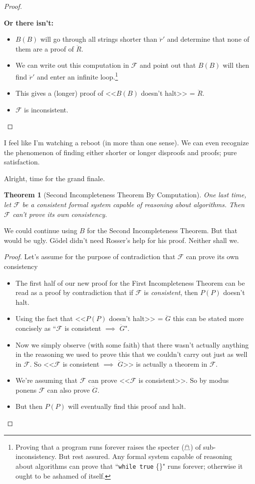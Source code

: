 \documentclass{article}
\theoremstyle{theorem}
\newtheorem{theorem}{Theorem}
\newcommand{\nameditem}[1]{\item\textbf{#1}}
\newcommand{\impl}{\item[$\Rightarrow$]}
\begin{document}
\begin{proof}
\begin{description}
\begin{description}
\begin{itemize}
\end{itemize}
\nameditem{Or there isn't:}
\begin{itemize}
\impl $B(B)$ will go through all strings shorter than $\ddot{r}'$ and determine that none of them are a proof of $\ddot{R}$.
\impl We can write out this computation in $\mathcal{F}$ and point out that $B(B)$ will then find $\ddot{r}'$ and enter an infinite loop.\footnote{Proving that a program runs forever raises the specter ($\mathghost$) of sub-inconsistency. But rest assured. Any formal system capable of reasoning about algorithms can prove that ``\lstinline{while true} \{\}" runs forever; otherwise it ought to be ashamed of itself.}
\impl This gives a (longer) proof of <<$B(B)$ doesn't halt>> = $\ddot{R}$.
\impl $\mathcal{F}$ is inconsistent. \lightning
\end{itemize}
\end{description}
\end{description}
\end{proof}

I feel like I'm watching a reboot (in more than one sense). We can even recognize the phenomenon of finding either shorter or longer disproofs and proofs; pure satisfaction.

Alright, time for the grand finale.

\begin{theorem}[Second Incompleteness Theorem By Computation]
One last time, let $\mathcal{F}$ be a consistent formal system capable of reasoning about algorithms. Then $\mathcal{F}$ can't prove its own consistency.
\end{theorem}

We could continue using $B$ for the Second Incompleteness Theorem. But that would be ugly. Gödel didn't need Rosser's help for his proof. Neither shall we.

\begin{proof}
Let's assume for the purpose of contradiction that $\mathcal{F}$ can prove its own consistency
\begin{itemize}
\impl The first half of our new proof for the First Incompleteness Theorem can be read as a proof by contradiction that if $\mathcal{F}$ is \textit{consistent}, then $P(P)$ doesn't halt.
\impl Using the fact that <<$P(P)$ doesn't halt>> = $\ddot{G}$ this can be stated more concisely as ``$\mathcal{F}$ is consistent $\implies$ $\ddot{G}$".
\impl Now we simply observe (with some faith) that there wasn't actually anything in the reasoning we used to prove this that we couldn't carry out just as well in $\mathcal{F}$. So <<$\mathcal{F}$ is consistent $\implies$ $\ddot{G}$>> is actually a theorem in $\mathcal{F}$.
\impl We're assuming that $\mathcal{F}$ can prove <<$\mathcal{F}$ is consistent>>. So by modus ponens $\mathcal{F}$ can also prove $\ddot{G}$.
\impl But then $P(P)$ will eventually find this proof and halt. \lightning
\end{itemize}
\end{proof}
\end{document}
